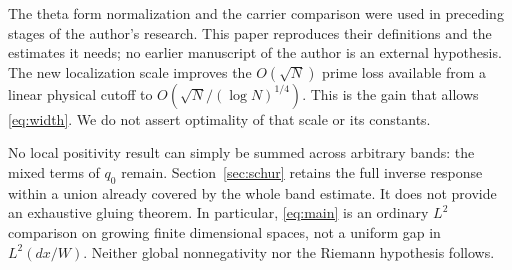 \documentclass[11pt]{article}
\theoremstyle{remark}
\begin{document}
The theta form normalization and the carrier comparison were used in
preceding stages of the author's research. This paper reproduces their
definitions and the estimates it needs; no earlier manuscript of the
author is an external hypothesis. The new localization scale improves
the $O(\sqrt N)$ prime loss available from a linear physical cutoff to
$O(\sqrt N/(\log N)^{1/4})$. This is the gain that allows
\eqref{eq:width}. We do not assert optimality of that scale or its constants.

No local positivity result can simply be summed across arbitrary bands:
the mixed terms of $q_0$ remain. Section~\ref{sec:schur} retains the full
inverse response within a union already covered by the whole band
estimate. It does not provide an exhaustive gluing theorem.
In particular, \eqref{eq:main} is an ordinary $L^2$ comparison on growing
finite dimensional spaces, not a uniform gap in $L^2(dx/W)$.
Neither global nonnegativity nor the Riemann hypothesis follows.
\end{document}
